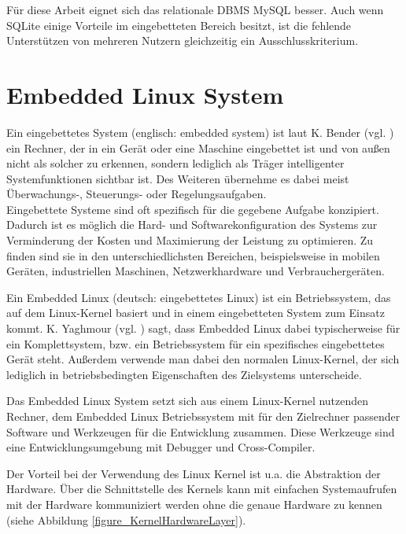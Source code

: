 Für diese Arbeit eignet sich das relationale \ac{DBMS} MySQL besser. Auch wenn SQLite einige Vorteile im eingebetteten Bereich besitzt, ist die fehlende Unterstützen von mehreren Nutzern gleichzeitig ein Ausschlusskriterium.

\newpage

\section{Embedded Linux System}
\label{section_EmbeddedLinux}

Ein eingebettetes System (englisch: embedded system) ist laut  K. Bender (vgl. \cite{bender2005embedded}) ein Rechner, der in ein Gerät oder eine Maschine eingebettet ist und von außen nicht als solcher zu erkennen, sondern lediglich als Träger intelligenter Systemfunktionen sichtbar ist. Des Weiteren übernehme es dabei meist Überwachungs-, Steuerungs- oder Regelungsaufgaben.\\
Eingebettete Systeme sind oft spezifisch für die gegebene Aufgabe konzipiert. Dadurch ist es möglich die Hard- und Softwarekonfiguration des Systems zur Verminderung der Kosten und Maximierung der Leistung zu optimieren. Zu finden sind sie in den unterschiedlichsten Bereichen, beispielsweise in mobilen Geräten, industriellen Maschinen, Netzwerkhardware und Verbrauchergeräten.\ 

Ein Embedded Linux (deutsch: eingebettetes Linux) ist ein Betriebssystem, das auf dem Linux-Kernel basiert und in einem eingebetteten System zum Einsatz kommt. K. Yaghmour (vgl. \cite{yaghmour2008building}) sagt, dass Embedded Linux dabei typischerweise für ein Komplettsystem, bzw. ein Betriebssystem für ein spezifisches eingebettetes Gerät steht. Außerdem verwende man dabei den normalen Linux-Kernel, der sich lediglich in betriebsbedingten Eigenschaften des Zielsystems unterscheide.\ 

Das Embedded Linux System setzt sich aus einem Linux-Kernel nutzenden Rechner, dem Embedded Linux Betriebssystem mit für den Zielrechner passender Software und Werkzeugen für die Entwicklung zusammen. Diese Werkzeuge sind eine Entwicklungsumgebung mit Debugger und Cross-Compiler.

Der Vorteil bei der Verwendung des Linux Kernel ist u.a. die Abstraktion der Hardware. Über die Schnittstelle des Kernels kann mit einfachen Systemaufrufen mit der Hardware kommuniziert werden ohne die genaue Hardware zu kennen (siehe Abbildung \ref{figure_KernelHardwareLayer}).\\

